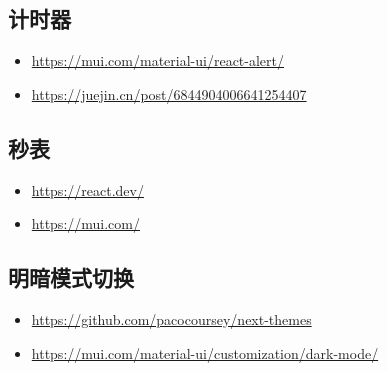 \documentclass[a4paper,11pt]{article}
\begin{document}
\subsection{计时器}
\begin{itemize}
    \item \url{https://mui.com/material-ui/react-alert/}
    \item \url{https://juejin.cn/post/6844904006641254407}
\end{itemize}

\subsection{秒表}
\begin{itemize}
    \item \url{https://react.dev/}
    \item \url{https://mui.com/}
\end{itemize}

\subsection{明暗模式切换}
\begin{itemize}
    \item \url{https://github.com/pacocoursey/next-themes}
    \item \url{https://mui.com/material-ui/customization/dark-mode/}
\end{itemize}
\end{document}
